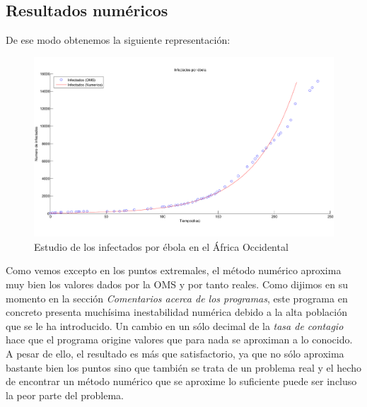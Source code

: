 \documentclass[a4paper,11pt]{article}
\numberwithin{equation}{section}
\begin{document}
\subsection{Resultados numéricos}
\indent De ese modo obtenemos la siguiente representación:
\begin{figure}[h!]
	\centering 		
	\includegraphics[width=1\textwidth]{grafica11.pdf}
	\caption{Estudio de los infectados por ébola en el África Occidental}
	\label{Fig:11}
\end{figure}

\indent Como vemos excepto en los puntos extremales, el método numérico aproxima muy bien los valores dados por la OMS y por tanto reales. Como dijimos en su momento en la sección \textit{Comentarios acerca de los programas}, este programa en concreto presenta muchísima inestabilidad numérica debido a la alta población que se le ha introducido. Un cambio en un sólo decimal de la \textit{tasa de contagio} hace que el programa origine valores que para nada se aproximan a lo conocido. A pesar de ello, el resultado es más que satisfactorio, ya que no sólo aproxima bastante bien los puntos sino que también se trata de un problema real y el hecho de encontrar un método numérico que se aproxime lo suficiente puede ser incluso la peor parte del problema.

\newpage
	
		
\end{document}
